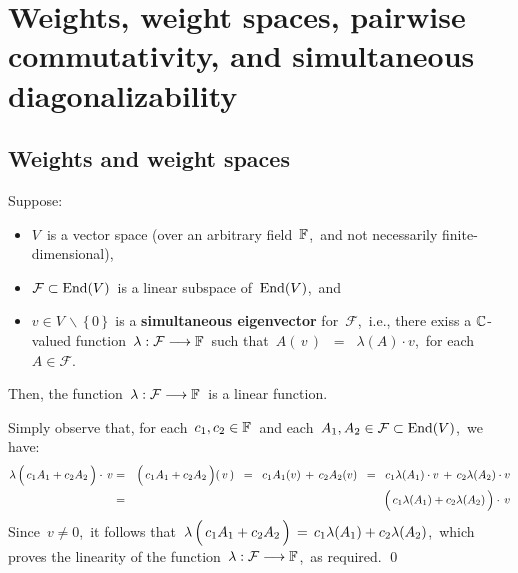 

\chapter{Weights, weight spaces, pairwise commutativity, and simultaneous diagonalizability}
\setcounter{theorem}{0}
\setcounter{equation}{0}


\renewcommand{\theenumi}{\roman{enumi}}
\renewcommand{\labelenumi}{\textnormal{(\theenumi)}$\;\;$}


\section{Weights and weight spaces}


\begin{lemma}
\mbox{}
\vskip 0.05cm
\noindent
Suppose:
\begin{itemize}
\item
    $V$\, is a vector space
    (over an arbitrary field \,$\mathbb{F}$,\, and not necessarily finite-dimensional),
\item
    $\mathcal{F} \subset \textnormal{End}(V)$\, is a linear subspace of \,$\textnormal{End}(V)$,\, and
\item
	$v \in V\,\backslash\,\{\,0\,\}$\, is
	a \textbf{simultaneous eigenvector} for \,$\mathcal{F}$,\, i.e.,
	there exiss a $\mathbb{C}$-valued function
	\,$\lambda : \mathcal{F} \longrightarrow \mathbb{F}$\,
	such that
	\,$
	A(\,v\,)
	\;\; = \;\;
		\lambda(A) \cdot v
	$,\,
	for each \,$A \in \mathcal{F}$.\,
\end{itemize}
Then, the function
\,$\lambda : \mathcal{F} \longrightarrow \mathbb{F}$\,
is a linear function.
\end{lemma}
\proof
Simply observe that,
for each \,$c_{1}, c_{2} \in \mathbb{F}$\, and each \,$A_{1}, A_{2} \in \mathcal{F} \subset \textnormal{End}(V)$,\,
we have:
\begin{eqnarray*}
\lambda\left(\,c_{1}A_{1} \overset{{\color{white}.}}{+} c_{2}A_{2}\,\right) \cdot\, v
& = &
    \left(\,c_{1}A_{1} \overset{{\color{white}.}}{+} c_{2}A_{2}\,\right)\!(\,v\,)
\;\; = \;\;
    c_{1}A_{1}(v) \,+\, c_{2}A_{2}(v)
\;\; = \;\;
    c_{1}\lambda(A_{1}) \cdot v \,+\, c_{2}\lambda(A_{2}) \cdot v
\\
& = &
    \left(\,c_{1}\lambda(A_{1}) \overset{{\color{white}.}}{+} c_{2}\lambda(A_{2})\,\right) \cdot\, v
\end{eqnarray*}
Since \,$v \neq 0$,\, it follows that
\,$
\lambda\left(\,c_{1}A_{1} \overset{{\color{white}.}}{+} c_{2}A_{2}\,\right)
\,=\,
    c_{1}\lambda(A_{1}) \overset{{\color{white}.}}{+} c_{2}\lambda(A_{2})
$,\,
which proves the linearity of the function
\,$\lambda : \mathcal{F} \longrightarrow \mathbb{F}$,\, as required.
\qed

